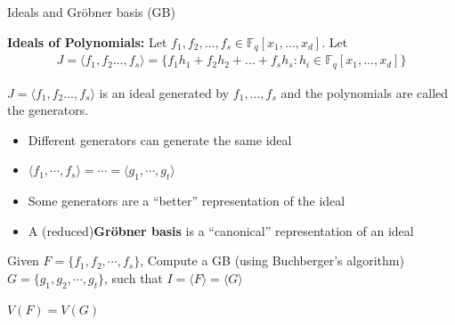 \documentclass[xcolor=dvipsnames]{beamer}
\newcommand{\Grobner}{Gr\"{o}bner\xspace}
\begin{document}
\begin{frame}{\large {Ideals and \Grobner basis (GB)}}
\vspace{-0.1in}


\begin{Definition}
{\bf Ideals of Polynomials:} Let $f_1, f_2, \ldots, f_s \in
\mathbb{F}_q[x_1, \dots, x_d]$. Let 
\begin{eqnarray}
J = \langle f_1, f_2 \ldots, f_s\rangle = \{f_1 h_1 + f_2 h_2 + \dots + f_s h_s:h_i\in\mathbb{F}_q[x_1, \dots, x_d]\} \nonumber 
\end{eqnarray}

$J = \langle f_1, f_2 \ldots, f_s\rangle$ is an ideal generated by
$f_1, \ldots, f_s$ and the polynomials are called the generators. 
\end{Definition}

\vspace{-0.1in}

\begin{itemize}
\item Different generators can generate the same ideal
\item $\langle f_1,\cdots,f_s \rangle=\cdots=\langle g_1,\cdots,g_t
  \rangle$
\item Some generators are a ``better'' representation of the ideal
\item A (reduced){\bf Gr\"obner basis} is a ``canonical'' representation of an ideal
\end{itemize}

Given $F = \{f_1, f_2,\cdots, f_s\}$, Compute a GB (using Buchberger's algorithm) $G =
\{g_1,g_2,\cdots,g_t\}$, such that $I = \langle F \rangle = \langle G \rangle$

\begin{center}
$V(F)=V(G)$
\end{center}
\end{frame}




\end{document}
